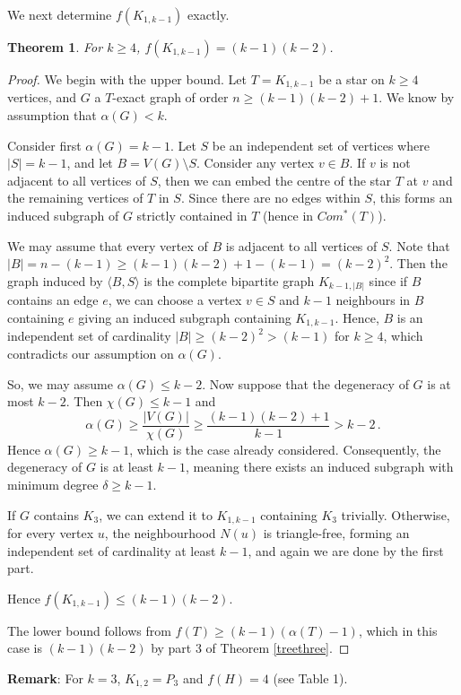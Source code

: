 \documentclass[a4paper,12pt]{article}
\newtheorem{theorem}{Theorem}[section]
\begin{document}
We next determine $f( K_{1,k-1})$ exactly.
\begin{theorem}
     For $k \ge 4$, $f(K_{1,k-1}) = (k-1)(k-2)$.
\end{theorem}
\begin{proof}
We begin with the upper bound.  Let $T = K_{1,k-1}$ be a star on $k \ge 4$ vertices, and $G$ a $T$-exact graph of order $n \ge (k-1)(k-2) + 1$. We know by assumption that $\alpha(G) < k$.

Consider first $\alpha(G) = k-1$. Let $S$ be an independent set of vertices where $|S| = k-1$, and let $B = V(G) \setminus S$. 
Consider any vertex $v \in B$. If $v$ is not adjacent to all vertices of $S$, then we can embed the centre of the star $T$ at $v$ and the remaining vertices of $T$ in $S$. Since there are no edges within $S$, this forms an induced subgraph of $G$ strictly contained in $T$ (hence in $Com^*(T)$).

We may assume that every vertex of $B$ is adjacent to all vertices of $S$. Note that $|B| = n - (k-1) \ge (k-1)(k-2) + 1 - (k-1) = (k-2)^2$.  Then the graph induced by $\langle B, S \rangle$ is the complete bipartite graph $K_{k-1, |B|}$ since if $B$ contains an edge $e$, we can choose a vertex $v \in S$ and $k-1$ neighbours in $B$ containing $e$ giving an induced subgraph containing $K_{1,k-1}$. Hence, $B$ is an independent set of cardinality $|B| \ge (k-2)^2 >(k-1)$ for $k \ge 4$, which contradicts our assumption on $\alpha(G)$.

So, we may assume $\alpha(G) \le k-2$. 
Now suppose that the degeneracy of $G$ is at most $k-2$. Then $\chi(G) \le k-1$ and
\[
\alpha(G) \ge \frac{|V(G)|}{\chi(G)} \ge \frac{(k-1)(k-2) + 1}{k-1} > k-2 \,.
\]
Hence $\alpha(G) \ge k-1$, which is the case already considered. 
Consequently, the degeneracy of $G$ is at least $k-1$, meaning there exists an induced subgraph with minimum degree $\delta \ge k-1$.

If $G$ contains $K_3$, we can extend it to $K_{1,k-1}$ containing $K_3$ trivially. Otherwise, for every vertex $u$, the neighbourhood $N(u)$ is triangle-free, forming an independent set of cardinality at least $k-1$, and again we are done by the first part.

Hence $f(K_{1,k-1}) \le (k-1)(k-2)$. 

The lower bound follows from $f(T) \ge (k-1)(\alpha(T) - 1)$, which in this case is $(k-1)(k-2)$ by part 3 of Theorem \ref{treethree}.
\end{proof}

\noindent \textbf{Remark}: For $k = 3$, $K_{1,2} = P_3$ and  $f(H) = 4$ (see Table 1).
\end{document}
